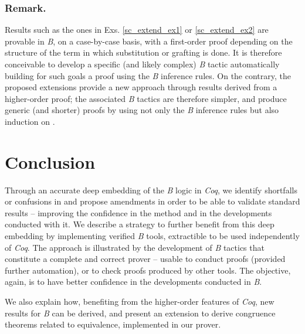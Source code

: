 \documentclass{llncs}
\begin{document}
\subsubsection{Remark.} Results such as the ones in Exs. \ref{sc_extend_ex1} or 
\ref{sc_extend_ex2} are provable in \emph{B}, on a case-by-case basis, with a first-order 
proof depending on the structure of the term in which substitution or grafting is done. It is 
therefore conceivable to develop a specific (and likely complex) \emph{B} tactic automatically 
building for such goals a proof using the \emph{B} inference rules. On the contrary, the 
proposed extensions provide a new approach through results derived from a higher-order proof; 
the associated \emph{B} tactics are therefore simpler, and produce generic (and shorter) 
proofs by using not only the \emph{B} inference rules but also induction on .

\section{Conclusion}\label{sc_conc}

Through an accurate deep embedding of the \emph{B} logic in \emph{Coq}, we identify shortfalls 
or confusions in \cite{abr:1} and propose amendments in order to be able to validate standard
results -- improving the confidence in the method and in the developments conducted with it.
We describe a strategy to further benefit from this deep embedding by implementing verified 
\emph{B} tools, extractible to be used independently of \emph{Coq}. The approach is 
illustrated by the development of \emph{B} tactics that constitute a complete and correct 
prover -- usable to conduct proofs (provided further automation), or to check proofs produced 
by other tools. The objective, again, is to have better confidence in the developments 
conducted in \emph{B}.

We also explain how, benefiting from the higher-order features of \emph{Coq}, new results for 
\emph{B} can be derived, and present an extension to derive congruence theorems related to 
equivalence, implemented in our prover.
\end{document}
